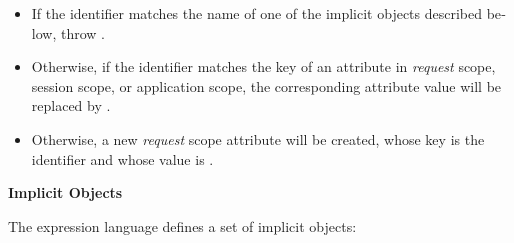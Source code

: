 \liststyleWWNumxv
\begin{itemize}
\item \foreignlanguage{english}{If the identifier matches the name of
one of the implicit objects described below,\newline
throw
}\foreignlanguage{english}{.
}
\item \foreignlanguage{english}{Otherwise, if the identifier matches the
key of an attribute in
}\foreignlanguage{english}{\textit{request}}\foreignlanguage{english}{
scope,\newline
session scope, or application scope, the corresponding attribute value
will be\newline
replaced by
}\foreignlanguage{english}{.
}
\item \foreignlanguage{english}{Otherwise, a new
}\foreignlanguage{english}{\textit{request}}\foreignlanguage{english}{
scope attribute will be created, whose key is the\newline
identifier and whose value is
}\foreignlanguage{english}{.
\newline
}
\end{itemize}
{\bfseries
\foreignlanguage{english}{Implicit Objects}\foreignlanguage{english}{ }}

\foreignlanguage{english}{The expression language defines a set of
implicit objects: }

